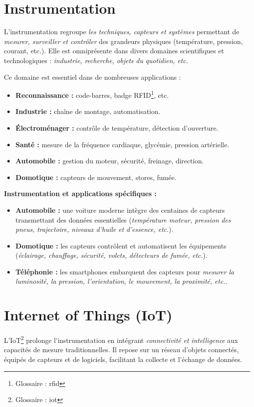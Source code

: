  \label{ch:Introduction}
\section{Instrumentation}
L'instrumentation regroupe \emph{les techniques, capteurs et systèmes} permettant 
de \emph{mesurer, surveiller et contrôler} des grandeurs physiques (température, pression, courant, etc.). Elle est omniprésente dans divers domaines scientifiques et technologiques : \emph{industrie, recherche, objets du quotidien, etc.}  

Ce domaine est essentiel dans de nombreuses applications :  
\begin{itemize}
  \item \textbf{Reconnaissance :} code-barres, badge RFID\footnote{Glossaire : \gls{rfid}}, etc.  
  \item \textbf{Industrie :} chaîne de montage, automatisation.  
  \item \textbf{Électroménager :} contrôle de température, détection d'ouverture.  
  \item \textbf{Santé :} mesure de la fréquence cardiaque, glycémie, pression artérielle.  
  \item \textbf{Automobile :} gestion du moteur, sécurité, freinage, direction.  
  \item \textbf{Domotique :} capteurs de mouvement, stores, fumée.  
\end{itemize}

\textbf{Instrumentation et applications spécifiques :}  
\begin{itemize}
  \item \textbf{Automobile :} une voiture moderne intègre des centaines de capteurs transmettant des données essentielles (\emph{température moteur, pression des pneus, trajectoire, niveaux d'huile et d'essence, etc.}).  
  \item \textbf{Domotique :} les capteurs contrôlent et automatisent les équipements (\emph{éclairage, chauffage, sécurité, volets, détecteurs de fumée, etc.}).  
  \item \textbf{Téléphonie :} les smartphones embarquent des capteurs pour \emph{mesurer la luminosité, la pression, l'orientation, le mouvement, la proximité, etc.}.  
\end{itemize}

\section{Internet of Things (IoT)}
L'IoT\footnote{Glossaire : \gls{iot}} prolonge l'instrumentation en intégrant \emph{connectivité et intelligence} aux capacités de mesure traditionnelles. Il repose sur un réseau d'objets connectés, équipés de capteurs et de logiciels, facilitant la collecte et l'échange de données.  


